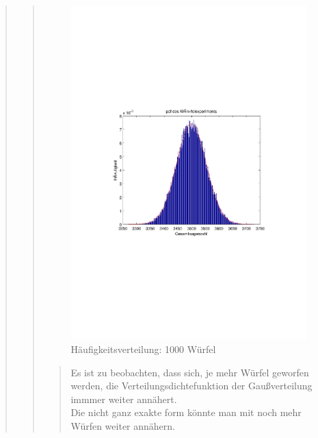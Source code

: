 \begin{quote}
\begin{quote}
        \begin{figure}[H]
        \centering
            \includegraphics[scale=0.7, trim = 20mm 80mm 20mm 90mm, clip]{Bilder/A1_3_1000}
                \caption{Häufigkeitsverteilung: 1000 Würfel}
                \label{fig:A1_3_1000}
        \end{figure}
    


        \begin{quote}
            

            
            Es ist zu beobachten, dass sich, je mehr Würfel geworfen werden, die Verteilungsdichtefunktion der Gaußverteilung
            immmer weiter annähert.\\
            Die nicht ganz exakte form könnte man mit noch mehr Würfen weiter annähern.
            
        \end{quote}
        
        
    \end{quote}
    
\end{quote}

